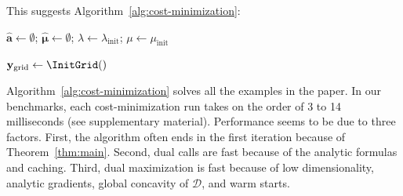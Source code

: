 This suggests Algorithm~\ref{alg:cost-minimization}:

\begin{algorithm}[H]
    \DontPrintSemicolon %
    \SetAlgoLined
    

    $\boldsymbol{\hat a} \gets \emptyset$; \quad
    $\boldsymbol{\hat\mu} \gets \emptyset$; \quad
    $\lambda \gets \lambda_{\text{init}}$; \quad
    $\mu \gets \mu_{\text{init}}$\;
    
    $\mathbf{y}_{\mathrm{grid}} \gets \InitGrid()$\;

    \BlankLine


    \caption{Cost minimization via active set}
    \label{alg:cost-minimization}
\end{algorithm}

Algorithm~\ref{alg:cost-minimization} solves all the examples in the paper. In our benchmarks, each cost-minimization run takes on the order of 3 to 14 milliseconds (see supplementary material). Performance seems to be due to three factors. First, the algorithm often ends in the first iteration because of Theorem~\ref{thm:main}. Second, dual calls are fast because of the analytic formulas and caching. Third, dual maximization is fast because of low dimensionality, analytic gradients, global concavity of $\mathcal{D}$, and warm starts.

